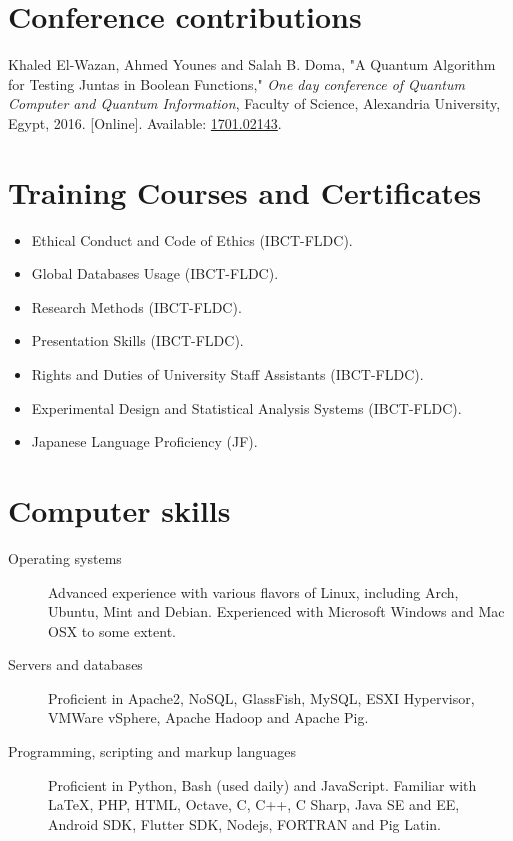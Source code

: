 \documentclass[margin,line]{resume}
\begin{document}
\begin{resume}
	\section{ \mysidestyle Conference contributions}


	Khaled El-Wazan, Ahmed Younes and Salah B. Doma, "A Quantum Algorithm for Testing Juntas in Boolean Functions," \textit{One day conference of Quantum Computer and Quantum Information}, Faculty of Science, Alexandria University, Egypt, 2016. [Online]. Available: \href{http://arxiv.org/abs/1701.02143}{1701.02143}.


	\section{\mysidestyle Training Courses and Certificates}
	\begin{itemize}

		\item Ethical Conduct and Code of Ethics (IBCT-FLDC).
		\item Global Databases Usage (IBCT-FLDC).
		\item Research Methods (IBCT-FLDC).
		\item Presentation Skills (IBCT-FLDC).
		\item Rights and Duties of University Staff Assistants (IBCT-FLDC).
		\item Experimental Design and Statistical Analysis Systems (IBCT-FLDC).
		\item Japanese Language Proficiency (JF).

	\end{itemize}




	\section{\mysidestyle Computer skills}\vspace{1mm}
	\begin{description}
		\item[Operating systems] Advanced experience with various flavors of Linux, including Arch, Ubuntu, Mint and Debian. Experienced with Microsoft Windows and Mac OSX to some extent.
		\item[Servers and databases] Proficient in Apache2, NoSQL, GlassFish, MySQL, ESXI Hypervisor, VMWare vSphere, Apache Hadoop and Apache Pig.
		\item[Programming, scripting and markup languages] Proficient in Python, Bash (used daily) and JavaScript. Familiar with \LaTeX, PHP, HTML, Octave, C, C++, C Sharp, Java SE and EE, Android SDK, Flutter SDK, Nodejs, FORTRAN and Pig Latin.
	\end{description}



\end{resume}
\end{document}

